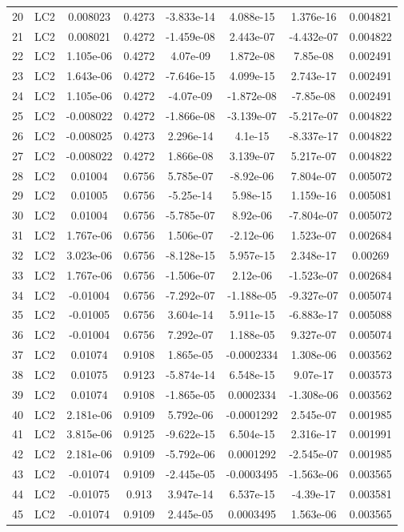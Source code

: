 \documentclass{article}%
\begin{document}
\begin{longtable}{| c c | c c c c c c |}
20&LC2&0.008023&0.4273&{-}3.833e{-}14&4.088e{-}15&1.376e{-}16&0.004821\\%
21&LC2&0.008021&0.4272&{-}1.459e{-}08&2.443e{-}07&{-}4.432e{-}07&0.004822\\%
22&LC2&1.105e{-}06&0.4272&4.07e{-}09&1.872e{-}08&7.85e{-}08&0.002491\\%
23&LC2&1.643e{-}06&0.4272&{-}7.646e{-}15&4.099e{-}15&2.743e{-}17&0.002491\\%
24&LC2&1.105e{-}06&0.4272&{-}4.07e{-}09&{-}1.872e{-}08&{-}7.85e{-}08&0.002491\\%
25&LC2&{-}0.008022&0.4272&{-}1.866e{-}08&{-}3.139e{-}07&{-}5.217e{-}07&0.004822\\%
26&LC2&{-}0.008025&0.4273&2.296e{-}14&4.1e{-}15&{-}8.337e{-}17&0.004822\\%
27&LC2&{-}0.008022&0.4272&1.866e{-}08&3.139e{-}07&5.217e{-}07&0.004822\\%
28&LC2&0.01004&0.6756&5.785e{-}07&{-}8.92e{-}06&7.804e{-}07&0.005072\\%
29&LC2&0.01005&0.6756&{-}5.25e{-}14&5.98e{-}15&1.159e{-}16&0.005081\\%
30&LC2&0.01004&0.6756&{-}5.785e{-}07&8.92e{-}06&{-}7.804e{-}07&0.005072\\%
31&LC2&1.767e{-}06&0.6756&1.506e{-}07&{-}2.12e{-}06&1.523e{-}07&0.002684\\%
32&LC2&3.023e{-}06&0.6756&{-}8.128e{-}15&5.957e{-}15&2.348e{-}17&0.00269\\%
33&LC2&1.767e{-}06&0.6756&{-}1.506e{-}07&2.12e{-}06&{-}1.523e{-}07&0.002684\\%
34&LC2&{-}0.01004&0.6756&{-}7.292e{-}07&{-}1.188e{-}05&{-}9.327e{-}07&0.005074\\%
35&LC2&{-}0.01005&0.6756&3.604e{-}14&5.911e{-}15&{-}6.883e{-}17&0.005088\\%
36&LC2&{-}0.01004&0.6756&7.292e{-}07&1.188e{-}05&9.327e{-}07&0.005074\\%
37&LC2&0.01074&0.9108&1.865e{-}05&{-}0.0002334&1.308e{-}06&0.003562\\%
38&LC2&0.01075&0.9123&{-}5.874e{-}14&6.548e{-}15&9.07e{-}17&0.003573\\%
39&LC2&0.01074&0.9108&{-}1.865e{-}05&0.0002334&{-}1.308e{-}06&0.003562\\%
40&LC2&2.181e{-}06&0.9109&5.792e{-}06&{-}0.0001292&2.545e{-}07&0.001985\\%
41&LC2&3.815e{-}06&0.9125&{-}9.622e{-}15&6.504e{-}15&2.316e{-}17&0.001991\\%
42&LC2&2.181e{-}06&0.9109&{-}5.792e{-}06&0.0001292&{-}2.545e{-}07&0.001985\\%
43&LC2&{-}0.01074&0.9109&{-}2.445e{-}05&{-}0.0003495&{-}1.563e{-}06&0.003565\\%
44&LC2&{-}0.01075&0.913&3.947e{-}14&6.537e{-}15&{-}4.39e{-}17&0.003581\\%
45&LC2&{-}0.01074&0.9109&2.445e{-}05&0.0003495&1.563e{-}06&0.003565\\%
\end{longtable}%
\end{document}
